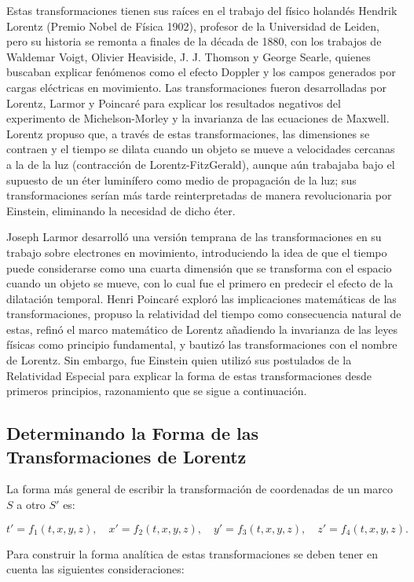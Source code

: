 Estas transformaciones tienen sus raíces en el trabajo del físico holandés Hendrik Lorentz (Premio Nobel de Física 1902), profesor de la Universidad de Leiden, pero su historia se remonta a finales de la década de 1880, con los trabajos de Waldemar Voigt, Olivier Heaviside, J. J. Thomson y George Searle, quienes buscaban explicar fenómenos como el efecto Doppler y los campos generados por cargas eléctricas en movimiento. Las transformaciones fueron desarrolladas por Lorentz, Larmor y Poincaré para explicar los resultados negativos del experimento de Michelson-Morley y la invarianza de las ecuaciones de Maxwell. Lorentz propuso que, a través de estas transformaciones, las dimensiones se contraen y el tiempo se dilata cuando un objeto se mueve a velocidades cercanas a la de la luz (contracción de Lorentz-FitzGerald), aunque aún trabajaba bajo el supuesto de un éter luminífero como medio de propagación de la luz; sus transformaciones serían más tarde reinterpretadas de manera revolucionaria por Einstein, eliminando la necesidad de dicho éter.

Joseph Larmor desarrolló una versión temprana de las transformaciones en su trabajo sobre electrones en movimiento, introduciendo la idea de que el tiempo puede considerarse como una cuarta dimensión que se transforma con el espacio cuando un objeto se mueve, con lo cual fue el primero en predecir el efecto de la dilatación temporal. Henri Poincaré exploró las implicaciones matemáticas de las transformaciones, propuso la relatividad del tiempo como consecuencia natural de estas, refinó el marco matemático de Lorentz añadiendo la invarianza de las leyes físicas como principio fundamental, y bautizó las transformaciones con el nombre de Lorentz. Sin embargo, fue Einstein quien utilizó sus postulados de la Relatividad Especial para explicar la forma de estas transformaciones desde primeros principios, razonamiento que se sigue a continuación.

\subsection{Determinando la Forma de las Transformaciones de Lorentz}

La forma más general de escribir la transformación de coordenadas de un marco $S$ a otro $S'$ es:

$$t' = f_1(t, x, y, z), \quad x' = f_2(t, x, y, z), \quad y' = f_3(t, x, y, z), \quad z' = f_4(t, x, y, z).$$

Para construir la forma analítica de estas transformaciones se deben tener en cuenta las siguientes consideraciones:

